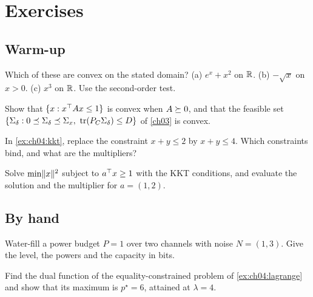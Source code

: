 
\section*{Exercises}

\subsection*{Warm-up}

\begin{exercise}\label{exr:ch04:which}
Which of these are convex on the stated domain? (a) $e^x+x^2$ on $\mathbb{R}$. (b) $-\sqrt x$ on $x>0$. (c) $x^3$ on $\mathbb{R}$. Use the second-order test.
\end{exercise}

\begin{exercise}\label{exr:ch04:ellipsoid}
Show that $\{x:x^{\top} Ax\le1\}$ is convex when $A\succeq0$, and that the feasible set $\{\Sd:0\preceq\Sd\preceq\Sigma_x,\ \tr(\PC\Sd)\le D\}$ of \cref{ch03} is convex.
\end{exercise}

\begin{exercise}\label{exr:ch04:slack}
In \cref{ex:ch04:kkt}, replace the constraint $x+y\le2$ by $x+y\le4$. Which constraints bind, and what are the multipliers?
\end{exercise}

\begin{exercise}\label{exr:ch04:halfspace}
Solve $\min\lVert x\rVert^2$ subject to $a^{\top} x\ge1$ with the KKT conditions, and evaluate the solution and the multiplier for $a=(1,2)$.
\end{exercise}

\subsection*{By hand}

\begin{exercise}\label{exr:ch04:cwf}
Water-fill a power budget $P=1$ over two channels with noise $N=(1,3)$. Give the level, the powers and the capacity in bits.
\end{exercise}

\begin{exercise}\label{exr:ch04:eqdual}
Find the dual function of the equality-constrained problem of \cref{ex:ch04:lagrange} and show that its maximum is $p^\star=6$, attained at $\lambda=4$.
\end{exercise}

